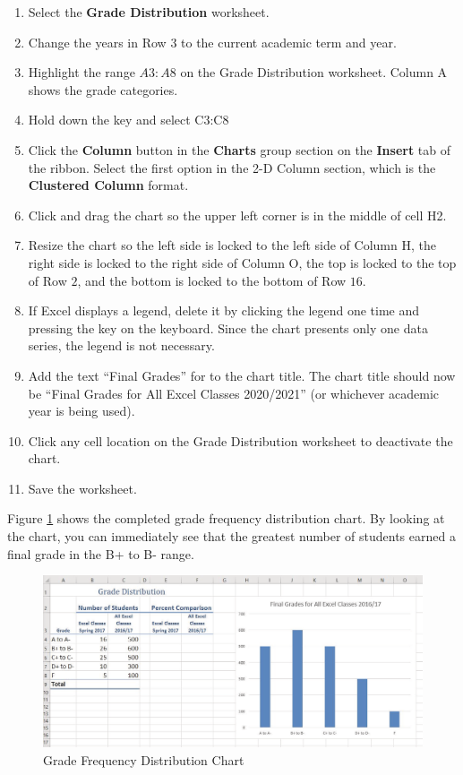 \begin{enumerate}
	\item Select the \textbf{Grade Distribution} worksheet.
	\item Change the years in Row $ 3 $ to the current academic term and year.
	\item Highlight the range $ A3:A8 $ on the Grade Distribution worksheet. Column A shows the grade categories.
	\item Hold down the  key and select \textsf{C3:C8}
	\item Click the \textbf{Column} button in the \textbf{Charts} group section on the \textbf{Insert} tab of the ribbon. Select the first option in the 2-D Column section, which is the \textbf{Clustered Column} format.
	\item Click and drag the chart so the upper left corner is in the middle of cell \textsf{H2}.
	\item Resize the chart so the left side is locked to the left side of Column H, the right side is locked to the right side of Column O, the top is locked to the top of Row $ 2 $, and the bottom is locked to the bottom of Row $ 16 $.
	\item If Excel displays a legend, delete it by clicking the legend one time and pressing the  key on the keyboard. Since the chart presents only one data series, the legend is not necessary.
	\item Add the text ``Final Grades'' for to the chart title. The chart title should now be ``Final Grades for All Excel Classes 2020/2021'' (or whichever academic year is being used).
	\item Click any cell location on the Grade Distribution worksheet to deactivate the chart.
	\item Save the worksheet.
\end{enumerate}

Figure \ref{04:fig13} shows the completed grade frequency distribution chart. By looking at the chart, you can immediately see that the greatest number of students earned a final grade in the B+ to B- range.

\begin{figure}[H]
	\centering
	\includegraphics[width=\maxwidth{.95\linewidth}]{gfx/ch04_fig13}
	\caption{Grade Frequency Distribution Chart}
	\label{04:fig13}
\end{figure}

